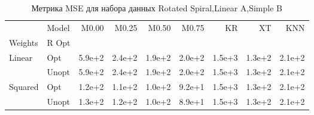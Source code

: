 \begin{table}
\caption{Метрика MSE для набора данных Rotated Spiral,Linear A,Simple B}
\label{tab:MSE_Rotated Spiral,Linear A,Simple B}
\begin{tabular}{llrrrrrrr}
\toprule
 & Model & M0.00 & M0.25 & M0.50 & M0.75 & KR & XT & KNN \\
Weights & R Opt &  &  &  &  &  &  &  \\
\midrule
\multirow[t]{2}{*}{Linear} & Opt & 5.9e+2 & 2.4e+2 & 1.9e+2 & 2.0e+2 & 1.5e+3 & 1.3e+2 & 2.1e+2 \\
 & Unopt & 5.9e+2 & 2.4e+2 & 1.9e+2 & 2.0e+2 & 1.5e+3 & 1.3e+2 & 2.1e+2 \\

\multirow[t]{2}{*}{Squared} & Opt & 1.2e+2 & 1.1e+2 & 1.0e+2 & 9.2e+1 & 1.5e+3 & 1.3e+2 & 2.1e+2 \\
 & Unopt & 1.3e+2 & 1.2e+2 & 1.0e+2 & 8.9e+1 & 1.5e+3 & 1.3e+2 & 2.1e+2 \\

\bottomrule
\end{tabular}
\end{table}
